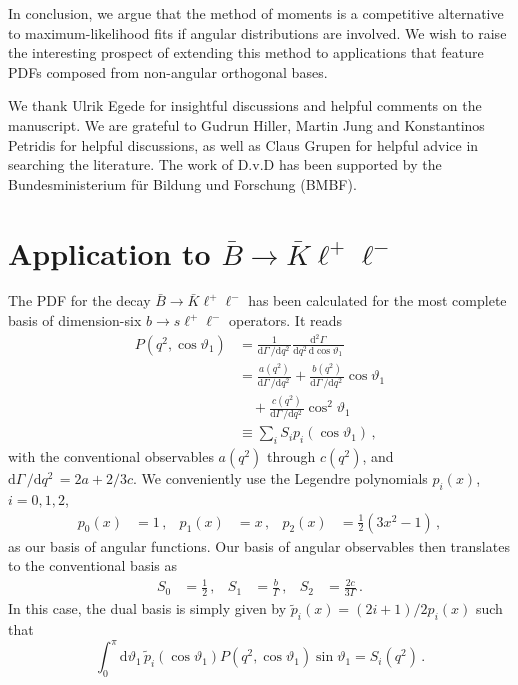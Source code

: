 \documentclass[aps,nofootinbib,preprintnumbers,prd,twocolumn]{revtex4-1}
\newcommand{\dual}[1]{\tilde{#1}}
\newcommand{\rmdx}[1]{\mbox{d} #1 \,} %
\renewcommand{\theta}{\vartheta}
\begin{document}
In conclusion, we argue that the method of moments is a competitive alternative to
maximum-likelihood fits if angular distributions are involved. We wish to raise
the interesting prospect of extending this method to applications that feature
PDFs composed from non-angular orthogonal bases.

\acknowledgments

We thank Ulrik Egede for insightful discussions and helpful comments on the
manuscript. We are grateful to Gudrun Hiller, Martin Jung and Konstantinos Petridis for helpful discussions,
as well as Claus Grupen for helpful advice in searching the literature.
The work of D.v.D has been supported by the Bundesministerium f\"ur Bildung und Forschung (BMBF).

\appendix

\section{Application to $\bar{B}\to\bar{K}\ell^+\ell^-$}
\label{app:btokll}

The PDF for the decay $\bar{B}\to\bar{K}\ell^+\ell^-$ has been calculated for the most
complete basis of dimension-six $b\to s \ell^+\ell^-$ operators. It reads \cite{Bobeth:2007dw,Bobeth:2012vn}
\begin{equation}
\begin{aligned}
    P(q^2, \cos\theta_1)
        & = \frac{1}{\rmdx{\Gamma}/\rmdx{q^2}} \frac{\rmdx{^2\Gamma}}{\rmdx{q^2} \rmdx{\cos\theta_1}}\\
        & = \frac{a(q^2)}{\rmdx{\Gamma}/\rmdx{q^2}} + \frac{b(q^2)}{\rmdx{\Gamma}/\rmdx{q^2}} \cos\theta_1\\
        & \quad + \frac{c(q^2)}{\rmdx{\Gamma}/\rmdx{q^2}} \cos^2\theta_1\\
        & \equiv \sum_i S_i p_i(\cos\theta_1)\,,
\end{aligned}
\end{equation}
with the conventional observables $a(q^2)$ through $c(q^2)$, and $\rmdx{\Gamma}/\rmdx{q^2} = 2a + 2/3 c$. We conveniently use the Legendre polynomials
$p_i(x)$, $i=0,1,2$,
\begin{equation}
\begin{aligned}
    p_0(x) & = 1\,, &
    p_1(x) & = x\,, &
    p_2(x) & = \frac{1}{2} (3x^2 - 1)\,,
\end{aligned}
\end{equation}
as our basis of angular functions. Our basis of angular observables then
translates to the conventional basis as
\begin{equation}
\begin{aligned}
    S_0 & = \frac{1}{2}\,, &
    S_1 & = \frac{b}{\Gamma}\,, &
    S_2 & = \frac{2c}{3\Gamma}\,.
\end{aligned}
\end{equation}
In this case, the dual basis is simply given by $\tilde{p}_i(x) = (2 i + 1)/2 p_i(x)$
such that
\begin{equation}
    \int_0^\pi \rmdx{\theta_1} \dual{p}_i(\cos\theta_1) P(q^2, \cos\theta_1)\sin\theta_1 = S_i(q^2)\,.
\end{equation}
\end{document}
